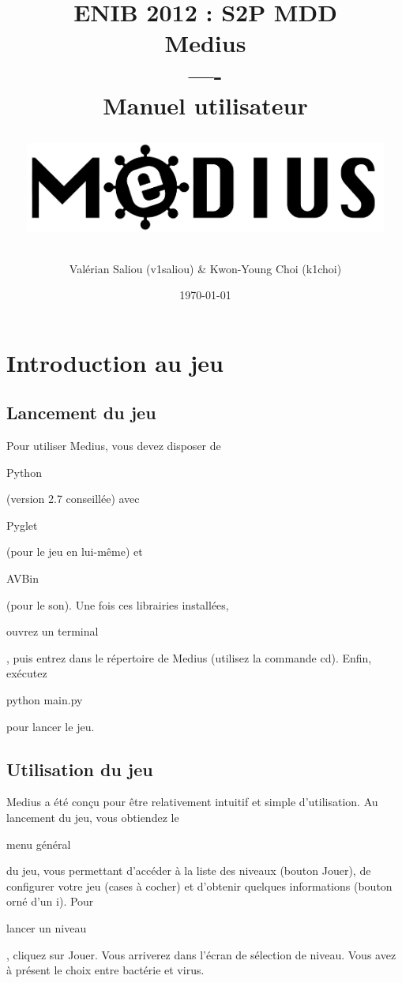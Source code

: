 \documentclass{article}
\title{{\Huge \bf ENIB 2012 : S2P  MDD} \\
\vspace*{2cm}
{\Huge \bf Medius} \\----\\ Manuel utilisateur \\
\vspace*{2cm}
\centerline{\includegraphics[height=3cm]{logomedius.jpg}}
}
\author{Valérian Saliou (v1saliou) \& Kwon-Young Choi (k1choi)}
\date\today
\begin{document}
\maketitle

\newpage

\section{Introduction au jeu}

\subsection{Lancement du jeu}

Pour utiliser Medius, vous devez disposer de \begin{bfseries}Python\end{bfseries} (version 2.7 conseillée) avec \begin{bfseries}Pyglet\end{bfseries} (pour le jeu en lui-même) et \begin{bfseries}AVBin\end{bfseries} (pour le son).
\newline\newline
Une fois ces librairies installées, \begin{bfseries}ouvrez un terminal\end{bfseries}, puis entrez dans le répertoire de Medius (utilisez la commande cd).
\newline\newline
Enfin, exécutez \begin{bfseries}python main.py\end{bfseries} pour lancer le jeu.
\newline\newline

\subsection{Utilisation du jeu}

Medius a été conçu pour être relativement intuitif et simple d'utilisation.
\newline\newline
Au lancement du jeu, vous obtiendez le \begin{bfseries}menu général\end{bfseries} du jeu, vous permettant d'accéder à la liste des niveaux (bouton Jouer), de configurer votre jeu (cases à cocher) et d'obtenir quelques informations (bouton orné d'un i).
\newline\newline
Pour \begin{bfseries}lancer un niveau\end{bfseries}, cliquez sur Jouer. Vous arriverez dans l'écran de sélection de niveau. Vous avez à présent le choix entre bactérie et virus.
\newline\newline
\end{document}

